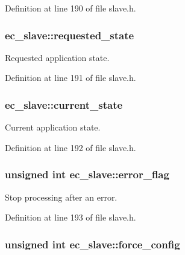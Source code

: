 \-Definition at line 190 of file slave.\-h.

\subsubsection[{requested\-\_\-state}]{ {\bf ec\-\_\-slave\-::requested\-\_\-state}}\label{structec__slave_af81c1abd2ac2b8a5a5bfbbfe7d79ce70}


\-Requested application state. 



\-Definition at line 191 of file slave.\-h.

\subsubsection[{current\-\_\-state}]{ {\bf ec\-\_\-slave\-::current\-\_\-state}}\label{structec__slave_a6214f41ec1dce05b67b298b89a49e1f8}


\-Current application state. 



\-Definition at line 192 of file slave.\-h.

\subsubsection[{error\-\_\-flag}]{\setlength{\rightskip}{0pt plus 5cm}unsigned int {\bf ec\-\_\-slave\-::error\-\_\-flag}}\label{structec__slave_aef33c89d3974546f5aed153b379d0d24}


\-Stop processing after an error. 



\-Definition at line 193 of file slave.\-h.

\subsubsection[{force\-\_\-config}]{\setlength{\rightskip}{0pt plus 5cm}unsigned int {\bf ec\-\_\-slave\-::force\-\_\-config}}\label{structec__slave_a0baba2f1593708191871119e3570655f}


